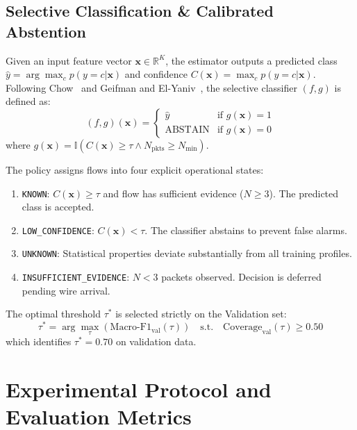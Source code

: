 \documentclass[conference]{IEEEtran}
\begin{document}
\subsection{Selective Classification \& Calibrated Abstention}
Given an input feature vector $\mathbf{x} \in \mathbb{R}^K$, the estimator outputs a predicted class $\hat{y} = \arg\max_{c} p(y=c|\mathbf{x})$ and confidence $C(\mathbf{x}) = \max_{c} p(y=c|\mathbf{x})$. Following Chow~\cite{chow1970optimum} and Geifman and El-Yaniv~\cite{geifman2017selective}, the selective classifier $(f, g)$ is defined as:
\begin{equation}
    (f, g)(\mathbf{x}) = \begin{cases} \hat{y} & \text{if } g(\mathbf{x}) = 1 \\ \text{ABSTAIN} & \text{if } g(\mathbf{x}) = 0 \end{cases}
\end{equation}
where $g(\mathbf{x}) = \mathbb{I}\left(C(\mathbf{x}) \ge \tau \land N_{\text{pkts}} \ge N_{\text{min}}\right)$.

The policy assigns flows into four explicit operational states:
\begin{enumerate}
    \item \texttt{KNOWN}: $C(\mathbf{x}) \ge \tau$ and flow has sufficient evidence ($N \ge 3$). The predicted class is accepted.
    \item \texttt{LOW\_CONFIDENCE}: $C(\mathbf{x}) < \tau$. The classifier abstains to prevent false alarms.
    \item \texttt{UNKNOWN}: Statistical properties deviate substantially from all training profiles.
    \item \texttt{INSUFFICIENT\_EVIDENCE}: $N < 3$ packets observed. Decision is deferred pending wire arrival.
\end{enumerate}
The optimal threshold $\tau^*$ is selected strictly on the Validation set:
\begin{equation}
    \tau^* = \arg\max_{\tau} \left( \text{Macro-F1}_{\text{val}}(\tau) \right) \quad \text{s.t.} \quad \text{Coverage}_{\text{val}}(\tau) \ge 0.50
\end{equation}
which identifies $\tau^* = 0.70$ on validation data.

\section{Experimental Protocol and Evaluation Metrics}
\label{sec:protocol}
\end{document}
